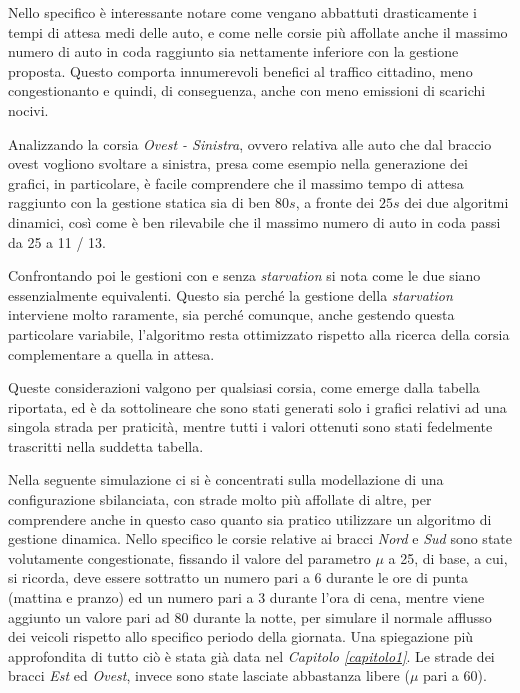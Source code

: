 Nello specifico è interessante notare come vengano abbattuti drasticamente i tempi di attesa medi delle auto, e come nelle corsie più affollate anche il massimo numero di auto in coda raggiunto sia nettamente inferiore con la gestione proposta. Questo comporta innumerevoli benefici al traffico cittadino, meno congestionanto e quindi, di conseguenza, anche con meno emissioni di scarichi nocivi. 

Analizzando la corsia \textit{Ovest - Sinistra}, ovvero relativa alle auto che dal braccio ovest vogliono svoltare a sinistra, presa come esempio nella generazione dei grafici, in particolare, è facile comprendere che il massimo tempo di attesa raggiunto con la gestione statica sia di ben $80s$, a fronte dei $25s$ dei due algoritmi dinamici, così come è ben rilevabile che il massimo numero di auto in coda passi da 25 a 11 / 13.

Confrontando poi le gestioni con e senza \textit{starvation} si nota come le due siano essenzialmente equivalenti. Questo sia perché la gestione della \textit{starvation} interviene molto raramente, sia perché comunque, anche gestendo questa particolare variabile, l'algoritmo resta ottimizzato rispetto alla ricerca della corsia complementare a quella in attesa.

Queste considerazioni valgono per qualsiasi corsia, come emerge dalla tabella riportata, ed è da sottolineare che sono stati generati solo i grafici relativi ad una singola strada per praticità, mentre tutti i valori ottenuti sono stati fedelmente trascritti nella suddetta tabella.
\newline

Nella seguente simulazione ci si è concentrati sulla modellazione di una configurazione sbilanciata, con strade molto più affollate di altre, per comprendere anche in questo caso quanto sia pratico utilizzare un algoritmo di gestione dinamica. Nello specifico le corsie relative ai bracci \textit{Nord} e \textit{Sud} sono state volutamente congestionate, fissando il valore del parametro $\mu$ a 25, di base, a cui, si ricorda, deve essere sottratto un numero pari a 6 durante le ore di punta (mattina e pranzo) ed un numero pari a 3 durante l'ora di cena, mentre viene aggiunto un valore pari ad 80 durante la notte, per simulare il normale afflusso dei veicoli rispetto allo specifico periodo della giornata. Una spiegazione più approfondita di tutto ciò è stata già data nel \textit{Capitolo \ref{capitolo1}}. Le strade dei bracci \textit{Est} ed \textit{Ovest}, invece sono state lasciate abbastanza libere ($\mu$ pari a 60).




